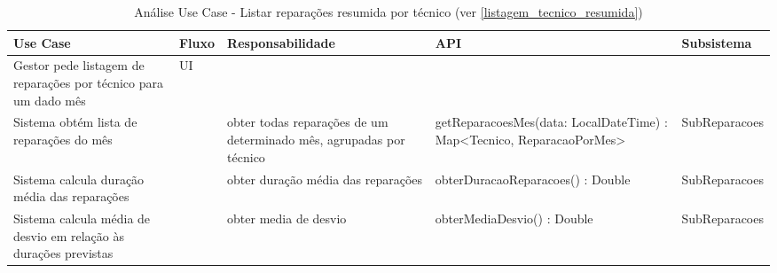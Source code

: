 \documentclass[../relatorio.tex]{subfiles}
\begin{document}
\begin{landscape}
    \begin{table}[!h]
        \centering
        \begin{tabular}{|p{5cm}|p{1cm}|p{4cm}|p{6cm}|p{4cm}|}
            \hline
            \rowcolor{gray!20!white}
            Use Case & Fluxo & Responsabilidade & API & Subsistema \\
            \hline
            \rowcolor{yellow}
            Gestor pede listagem de reparações por técnico para um dado mês %
                     & 
            UI
                     & 
                     & 
                     & 
            \\
            \hline
            Sistema obtém lista de reparações do mês
                     & 
                     & 
            obter todas reparações de um determinado mês, agrupadas por técnico
                     & 
            getReparacoesMes(data: LocalDateTime) : Map<Tecnico, ReparacaoPorMes>
                     & 
            SubReparacoes
            \\
            \hline
            Sistema calcula duração média das reparações
                     & 
                     & 
            obter duração média das reparações
                     & 
            obterDuracaoReparacoes() : Double
                     & 
            SubReparacoes
            \\
            \hline
            Sistema calcula média de desvio em relação às durações previstas
                     & 
                     & 
            obter media de desvio
                     & 
            obterMediaDesvio() : Double
                     & 
            SubReparacoes
            \\
            \hline
        \end{tabular}
        \caption{Análise Use Case - Listar reparações resumida por técnico (ver \ref{listagem_tecnico_resumida})}
    \end{table}
\end{landscape}
\end{document}
